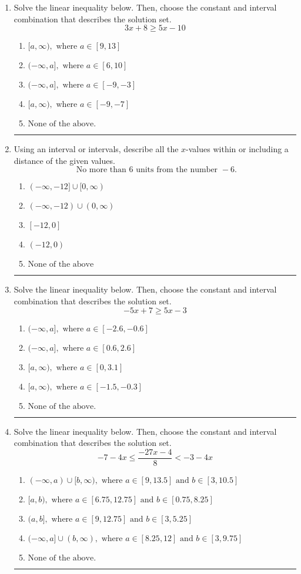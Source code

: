 \documentclass[14pt]{extbook}
\newcommand{\litem}[1]{\item#1\hspace*{-1cm}\rule{\textwidth}{0.4pt}}
\begin{document}
\begin{enumerate}
{\begin{enumerate}[label=\Alph*.]
\end{enumerate} }
\litem{
Solve the linear inequality below. Then, choose the constant and interval combination that describes the solution set.\[ 3x + 8 \geq 5x -10 \]\begin{enumerate}[label=\Alph*.]
\item \( [a, \infty), \text{ where } a \in [9, 13] \)
\item \( (-\infty, a], \text{ where } a \in [6, 10] \)
\item \( (-\infty, a], \text{ where } a \in [-9, -3] \)
\item \( [a, \infty), \text{ where } a \in [-9, -7] \)
\item \( \text{None of the above}. \)

\end{enumerate} }
\litem{
Using an interval or intervals, describe all the $x$-values within or including a distance of the given values.\[ \text{ No more than } 6 \text{ units from the number } -6. \]\begin{enumerate}[label=\Alph*.]
\item \( (-\infty, -12] \cup [0, \infty) \)
\item \( (-\infty, -12) \cup (0, \infty) \)
\item \( [-12, 0] \)
\item \( (-12, 0) \)
\item \( \text{None of the above} \)

\end{enumerate} }
\litem{
Solve the linear inequality below. Then, choose the constant and interval combination that describes the solution set.\[ -5x + 7 \geq 5x -3 \]\begin{enumerate}[label=\Alph*.]
\item \( (-\infty, a], \text{ where } a \in [-2.6, -0.6] \)
\item \( (-\infty, a], \text{ where } a \in [0.6, 2.6] \)
\item \( [a, \infty), \text{ where } a \in [0, 3.1] \)
\item \( [a, \infty), \text{ where } a \in [-1.5, -0.3] \)
\item \( \text{None of the above}. \)

\end{enumerate} }
\litem{
Solve the linear inequality below. Then, choose the constant and interval combination that describes the solution set.\[ -7 - 4 x \leq \frac{-27 x - 4}{8} < -3 - 4 x \]\begin{enumerate}[label=\Alph*.]
\item \( (-\infty, a) \cup [b, \infty), \text{ where } a \in [9, 13.5] \text{ and } b \in [3, 10.5] \)
\item \( [a, b), \text{ where } a \in [6.75, 12.75] \text{ and } b \in [0.75, 8.25] \)
\item \( (a, b], \text{ where } a \in [9, 12.75] \text{ and } b \in [3, 5.25] \)
\item \( (-\infty, a] \cup (b, \infty), \text{ where } a \in [8.25, 12] \text{ and } b \in [3, 9.75] \)
\item \( \text{None of the above.} \)


\end{enumerate}}
\end{enumerate}
\end{document}
